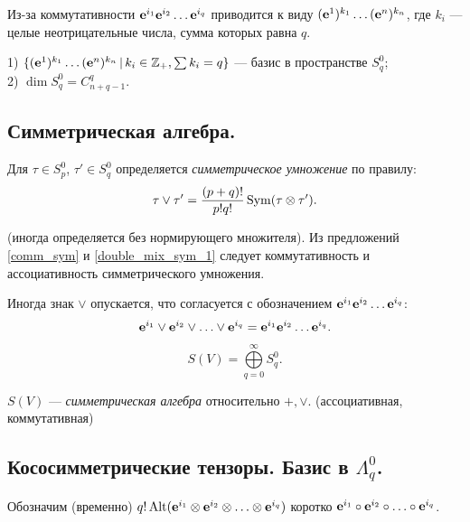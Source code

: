 Из-за коммутативности $\mathbf{e}^{i_1}\mathbf{e}^{i_2}\ldots \mathbf{e}^{i_q}$ 
приводится к виду $(\mathbf{e}^1)^{k_1}\ldots (\mathbf{e}^n)^{k_n}$,
где $k_i$ --- целые неотрицательные числа, сумма которых равна $q$.


\begin{predl}
1) $\{(\mathbf{e}^1)^{k_1}\ldots (\mathbf{e}^n)^{k_n} \, |\, k_i\in \mathbb{Z}_{+}, \sum k_i = q\}$ ---
 базис в пространстве $S^0_q$;\\
2) $\dim S^0_q = C_{n+q-1}^q$.
\end{predl}


\subsection{%
Симметрическая алгебра.}




Для $\tau \in S^0_p$, $\tau ' \in S^0_{q}$ определяется {\it симметрическое умножение} по правилу: 
$$\tau \lor \tau ' =  \dfrac{(p+q)!}{p!q!} \mathop{\rm Sym}\nolimits(\tau \otimes \tau '). $$

(иногда определяется без нормирующего множителя).
Из предложений \ref{comm_sym} и 
\ref{double_mix_sym_1} следует коммутативность и ассоциативность симметрического умножения.


Иногда знак $\lor$ опускается, что согласуется с 
обозначением $\mathbf{e}^{i_1}\mathbf{e}^{i_2}\ldots \mathbf{e}^{i_q}$:
$$\mathbf{e}^{i_1}\lor \mathbf{e}^{i_2}\lor \ldots \lor \mathbf{e}^{i_q} = \mathbf{e}^{i_1}\mathbf{e}^{i_2}\ldots \mathbf{e}^{i_q}.$$


$$S(V ) = \bigoplus\limits_{q=0}^{\infty} S^0_q.$$

$S(V )$ --- {\it симметрическая алгебра} относительно $+, \lor$.
(ассоциативная, коммутативная)



\subsection{Кососимметрические тензоры. Базис в $\Lambda^0_q$.}


Обозначим (временно) $q! \mathop{\rm Alt}\nolimits (\mathbf{e}^{i_1} \otimes \mathbf{e}^{i_2} \otimes \ldots \otimes \mathbf{e}^{i_q})$ 
коротко $\mathbf{e}^{i_1} \circ \mathbf{e}^{i_2}\circ  \ldots \circ  \mathbf{e}^{i_q}$.


